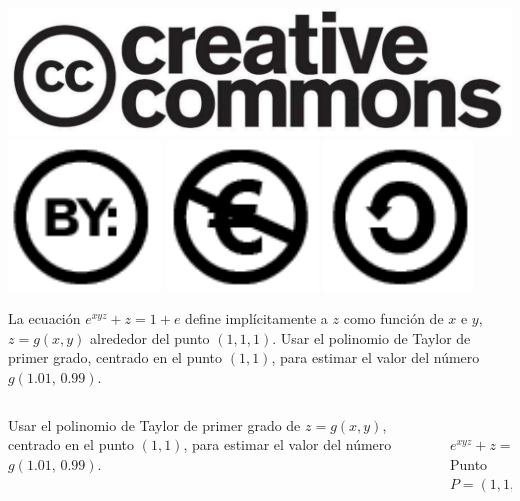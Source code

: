 \documentclass[aspectratio=149,10pt,xcolor=dvipsnames,t]{beamer}
\begin{document}
\begin{frame}[c]
\begin{center}
\biskip
\includegraphics[scale=0.07]{img/cc-logo}
\includegraphics[scale=0.2]{img/cc-by}
\includegraphics[scale=0.2]{img/cc-e}
\includegraphics[scale=0.2]{img/cc-c}
\end{center}
\end{frame}

\begin{frame}[c]
La ecuación $e^{xyz}+z=1+e$ define implícitamente a $z$ como función de $x$ e $y$, $z=g(x,y)$ alrededor
del punto $(1,1,1)$. Usar el polinomio de Taylor de primer grado, centrado en el punto $(1,1)$, para estimar el valor
del número $g(1.01,\,0.99)$.
\end{frame}


\begin{frame}
\begin{columns}
\begin{column}[T]{0.65\textwidth}
Usar el polinomio de Taylor de primer grado de $z=g(x,y)$, centrado en el punto $(1,1)$, para estimar el valor
del número $g(1.01,\,0.99)$.
\end{column}
\begin{column}[T]{0.35\textwidth}
\\
$e^{xyz}+z=1+e$\\
Punto $P=(1,1,1)$
\end{column}
\end{columns}
\end{frame}
\end{document}
